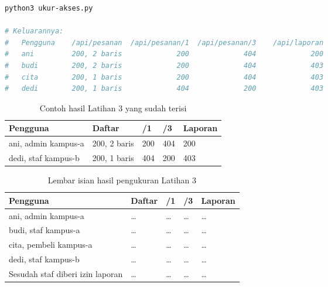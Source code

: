 \begin{lstlisting}[language=bash, caption={Menjalankan matriks hak akses, tersedia di \berkas{sources/chapter10/ukur-akses.py}}, label={lst:c10-lat3-jalan}]
python3 ukur-akses.py

# Keluarannya:
#   Pengguna    /api/pesanan  /api/pesanan/1  /api/pesanan/3    /api/laporan
#   ani         200, 2 baris             200             404             200
#   budi        200, 2 baris             200             404             403
#   cita        200, 1 baris             200             404             403
#   dedi        200, 1 baris             404             200             403
\end{lstlisting}

\begin{table}[!htb]
  \centering
  \caption{Contoh hasil Latihan 3 yang sudah terisi}
  \label{tab:c10-lat3-contoh}
  \begin{tabularx}{\textwidth}{Xllll}
    \hline
    \textbf{Pengguna} & \textbf{Daftar} & \textbf{/1} & \textbf{/3} & \textbf{Laporan} \\
    \hline
    ani, admin kampus-a & 200, 2 baris & 200 & 404 & 200 \\
    \hline
    dedi, staf kampus-b & 200, 1 baris & 404 & 200 & 403 \\
    \hline
  \end{tabularx}
\end{table}

\begin{table}[!htb]
  \centering
  \caption{Lembar isian hasil pengukuran Latihan 3}
  \label{tab:c10-lat3-hasil}
  \begin{tabularx}{\textwidth}{Xllll}
    \hline
    \textbf{Pengguna} & \textbf{Daftar} & \textbf{/1} & \textbf{/3} & \textbf{Laporan} \\
    \hline
    ani, admin kampus-a & \dots & \dots & \dots & \dots \\
    \hline
    budi, staf kampus-a & \dots & \dots & \dots & \dots \\
    \hline
    cita, pembeli kampus-a & \dots & \dots & \dots & \dots \\
    \hline
    dedi, staf kampus-b & \dots & \dots & \dots & \dots \\
    \hline
    Sesudah staf diberi izin laporan & \dots & \dots & \dots & \dots \\
    \hline
  \end{tabularx}
\end{table}

